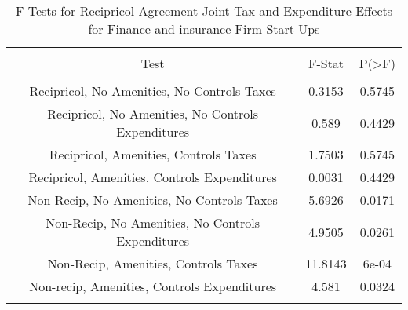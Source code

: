 
\begin{table}[!htbp] \centering 
  \caption{F-Tests for Recipricol Agreement Joint Tax and Expenditure Effects for Finance and insurance Firm Start Ups} 
  \label{52Ftests} 
\begin{tabular}{@{\extracolsep{5pt}} ccc} 
\\[-1.8ex]\hline 
\hline \\[-1.8ex] 
Test & F-Stat & P(\textgreater F) \\ 
\hline \\[-1.8ex] 
Recipricol, No Amenities, No Controls Taxes & 0.3153 & 0.5745 \\ 
Recipricol, No Amenities, No Controls Expenditures & 0.589 & 0.4429 \\ 
Recipricol, Amenities, Controls Taxes & 1.7503 & 0.5745 \\ 
Recipricol, Amenities, Controls Expenditures & 0.0031 & 0.4429 \\ 
Non-Recip, No Amenities, No Controls Taxes & 5.6926 & 0.0171 \\ 
Non-Recip, No Amenities, No Controls Expenditures & 4.9505 & 0.0261 \\ 
Non-Recip, Amenities, Controls Taxes & 11.8143 & 6e-04 \\ 
Non-recip, Amenities, Controls Expenditures & 4.581 & 0.0324 \\ 
\hline \\[-1.8ex] 
\end{tabular} 
\end{table} 

